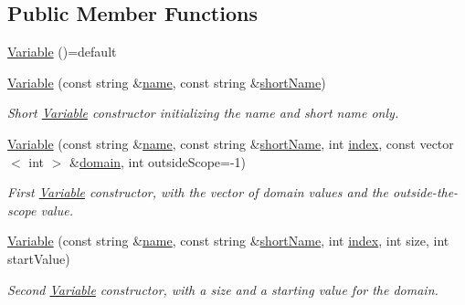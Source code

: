 \subsection*{Public Member Functions}
\begin{DoxyCompactItemize}
\item 
\hyperlink{classghost_1_1Variable_af68388a15c2b19251381dc5599a959bb}{Variable} ()=default
\item 
\hyperlink{classghost_1_1Variable_a639fef26bc88d8036352613ffbd30850}{Variable} (const string \&\hyperlink{classghost_1_1Variable_a05cf4a4cd3a5c033028e0b0f11d1dafd}{name}, const string \&\hyperlink{classghost_1_1Variable_afb5eb79a7f6351b4305fe082699b6d7d}{short\-Name})
\begin{DoxyCompactList}\small\item\em Short \hyperlink{classghost_1_1Variable}{Variable} constructor initializing the name and short name only. \end{DoxyCompactList}\item 
\hyperlink{classghost_1_1Variable_ae63bdac05a099dfc50db3eea347714e0}{Variable} (const string \&\hyperlink{classghost_1_1Variable_a05cf4a4cd3a5c033028e0b0f11d1dafd}{name}, const string \&\hyperlink{classghost_1_1Variable_afb5eb79a7f6351b4305fe082699b6d7d}{short\-Name}, int \hyperlink{classghost_1_1Variable_a934efa463fb1897b4266040e321dbc41}{index}, const vector$<$ int $>$ \&\hyperlink{classghost_1_1Variable_a78be8576a9911272d521132a2e860514}{domain}, int outside\-Scope=-\/1)
\begin{DoxyCompactList}\small\item\em First \hyperlink{classghost_1_1Variable}{Variable} constructor, with the vector of domain values and the outside-\/the-\/scope value. \end{DoxyCompactList}\item 
\hyperlink{classghost_1_1Variable_ac25d5b4b8cb81ea813db47a6aef60331}{Variable} (const string \&\hyperlink{classghost_1_1Variable_a05cf4a4cd3a5c033028e0b0f11d1dafd}{name}, const string \&\hyperlink{classghost_1_1Variable_afb5eb79a7f6351b4305fe082699b6d7d}{short\-Name}, int \hyperlink{classghost_1_1Variable_a934efa463fb1897b4266040e321dbc41}{index}, int size, int start\-Value)
\begin{DoxyCompactList}\small\item\em Second \hyperlink{classghost_1_1Variable}{Variable} constructor, with a size and a starting value for the domain. \end{DoxyCompactList}\item 

\end{DoxyCompactItemize}
